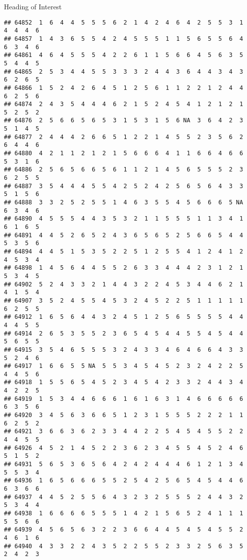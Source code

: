 \documentclass[
  ignorenonframetext,
]{beamer}
\begin{document}
\begin{frame}[fragile]{Heading of Interest}
\begin{verbatim}
## 64852  1  6  4  4  5  5  5  6  2  1  4  2  4  6  4  2  5  5  3  1  4  4  4  6
## 64857  1  4  3  6  5  5  4  2  4  5  5  5  1  1  5  6  5  5  6  4  6  3  4  6
## 64861  4  6  4  5  5  5  4  2  2  6  1  1  5  6  6  4  5  6  3  5  5  4  4  5
## 64865  2  5  3  4  4  5  5  3  3  3  2  4  4  3  6  4  4  3  4  3  6  2  6  5
## 64866  1  5  2  4  2  6  4  5  1  2  5  6  1  1  2  2  1  2  4  4  6  2  5  6
## 64874  2  4  3  5  4  4  4  6  2  1  5  2  4  5  4  1  2  1  2  1  5  2  5  2
## 64876  2  5  6  6  5  6  5  3  1  5  3  1  5  6 NA  3  6  4  2  3  5  1  4  5
## 64877  2  4  4  4  2  6  6  5  1  2  2  1  4  5  5  2  3  5  6  2  6  4  4  6
## 64880  4  2  1  1  2  1  2  1  5  6  6  6  4  1  1  6  6  4  6  6  5  3  1  6
## 64886  2  5  6  5  6  6  5  6  1  1  2  1  4  5  6  5  5  5  2  3  6  2  5  5
## 64887  3  5  4  4  4  5  5  4  2  5  2  4  2  5  6  5  6  4  3  3  5  1  5  6
## 64888  3  3  2  5  2  5  5  1  4  6  3  5  5  4  5  6  6  6  5 NA  6  3  4  6
## 64890  4  5  5  5  4  4  3  5  3  2  1  1  5  5  5  1  1  3  4  1  6  1  6  5
## 64891  4  4  5  2  6  5  2  4  3  6  5  6  5  2  5  6  6  5  4  4  5  3  5  6
## 64894  4  4  5  1  5  3  5  2  2  5  1  2  5  5  4  1  2  4  1  2  4  5  3  4
## 64898  1  4  5  6  4  4  5  5  2  6  3  3  4  4  4  2  3  1  2  1  5  3  4  5
## 64902  5  2  4  3  3  2  1  4  4  3  2  2  4  5  3  4  4  6  2  1  4  1  5  4
## 64907  3  5  2  4  5  5  4  5  3  2  4  5  2  2  5  1  1  1  1  1  6  2  5  5
## 64912  1  6  5  6  4  4  3  2  4  5  1  2  5  6  5  5  5  5  4  4  4  4  5  5
## 64914  2  6  5  3  5  5  2  3  6  5  4  5  4  4  5  5  4  5  4  4  5  6  5  5
## 64915  3  5  4  6  5  5  5  3  2  4  3  3  4  6  4  6  6  4  3  3  5  2  4  6
## 64917  1  6  6  5  5 NA  5  5  3  4  5  4  5  2  3  2  4  2  2  5  4  4  5  6
## 64918  1  5  5  6  5  4  5  2  3  4  5  4  2  3  3  2  4  4  3  4  4  2  2  5
## 64919  1  5  3  4  4  6  6  6  1  6  1  6  3  1  4  6  6  6  6  6  6  3  5  6
## 64920  3  4  5  6  3  6  6  5  1  2  3  1  5  5  5  2  2  2  1  1  6  2  5  2
## 64921  3  6  6  3  6  2  3  3  4  4  2  2  5  4  5  4  5  5  2  2  4  4  5  5
## 64926  4  5  2  1  4  5  2  2  3  6  2  3  4  5  5  4  5  2  4  6  5  1  5  2
## 64931  5  6  5  3  6  5  6  4  2  4  2  4  4  4  6  1  2  1  3  4  5  5  3  4
## 64936  1  6  5  6  6  6  5  5  2  5  4  2  5  6  5  4  5  4  4  6  6  3  6  6
## 64937  4  4  5  2  5  5  6  4  3  2  3  2  5  5  5  2  4  4  3  2  5  3  4  4
## 64938  1  6  6  6  6  5  5  5  1  4  2  1  5  6  5  2  4  1  1  1  5  5  6  6
## 64939  4  5  6  5  6  3  2  2  3  6  6  4  4  5  4  5  4  5  5  2  4  6  1  6
## 64940  4  3  3  2  2  4  3  5  2  2  5  5  2  3  3  2  5  6  3  5  2  4  2  3

\end{verbatim}
\end{frame}
\end{document}
